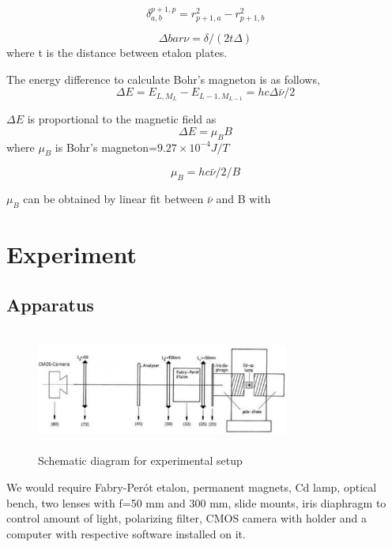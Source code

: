 \documentclass[a4paper, amsfonts, amssymb, amsmath, reprint, showkeys, nofootinbib, twoside]{revtex4-1}
\begin{document}
\begin{equation}
	\delta^{p+1,p}_{a,b}=r^2_{p+1,a}-r^2_{p+1,b}
\end{equation}

\begin{equation}
	\Delta bar{\nu}=\delta/(2t\Delta)
\end{equation}
 where t is the distance between etalon plates.
 
 The energy difference to calculate Bohr's magneton is as follows,
 \begin{equation}
 	\Delta E=E_{L,M_L}-E_{L-1,M_{L-1}}=hc\Delta\bar{\nu}/2
 \end{equation}

$\Delta E$ is proportional to the magnetic field as
\begin{equation}
	\Delta E=\mu_BB
\end{equation}
 where $\mu_B$ is Bohr's magneton=$9.27\times10^{-4} J/T$
 
 \begin{equation}
\mu_B=hc\bar{\nu}/2/B
 \end{equation}

$\mu_B$ can be obtained by linear fit between $\bar{\nu}$ and B with 

\section{Experiment}
\subsection{Apparatus}
\begin{figure}[H] %
	\centering
	\includegraphics[width=8.3cm,height=4cm]{1} 
	\caption{Schematic diagram for experimental setup}
	\label{5}
\end{figure}

We would require Fabry-Perót etalon, permanent magnets, Cd lamp, optical bench, two lenses with f=50 mm and 300 mm, slide mounts, iris diaphragm to control amount of light, polarizing filter, CMOS camera with holder and a computer with respective software installed on it.
\end{document}
